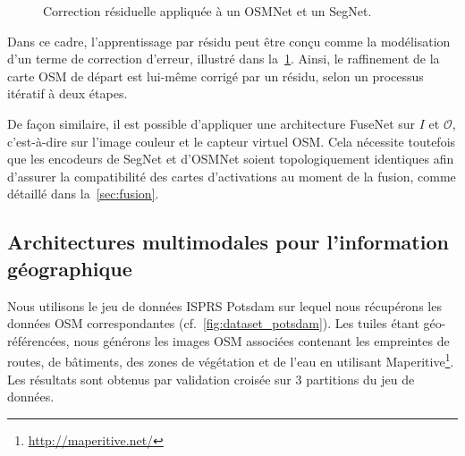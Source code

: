 \begin{figure}[t]
  \resizebox{\textwidth}{!}{}
  \caption{Correction résiduelle appliquée à un OSMNet et un SegNet.}
  \label{fig:refinet}
\end{figure}

Dans ce cadre, l'apprentissage par résidu peut être conçu comme la modélisation d'un terme de correction d'erreur, illustré dans la~\cref{fig:refinet}. Ainsi, le raffinement de la carte \gls{OSM} de départ est lui-même corrigé par un résidu, selon un processus itératif à deux étapes.

De façon similaire, il est possible d'appliquer une architecture \gls{FuseNet} sur $I$ et $\mathcal{O}$, c'est-à-dire sur l'image couleur et le capteur virtuel \gls{OSM}. Cela nécessite toutefois que les encodeurs de SegNet et d'OSMNet soient topologiquement identiques afin d'assurer la compatibilité des cartes d'activations au moment de la fusion, comme détaillé dans la~\cref{sec:fusion}.

\subsection{Architectures multimodales pour l'information géographique}

Nous utilisons le jeu de données \gls{ISPRS} Potsdam sur lequel nous récupérons les données \gls{OSM} correspondantes (cf.~\cref{fig:dataset_potsdam}). Les tuiles étant géo-référencées, nous générons les images \gls{OSM} associées contenant les empreintes de routes, de bâtiments, des zones de végétation et de l'eau en utilisant Maperitive\footnote{\url{http://maperitive.net/}}. Les résultats sont obtenus par validation croisée sur 3 partitions du jeu de données.


